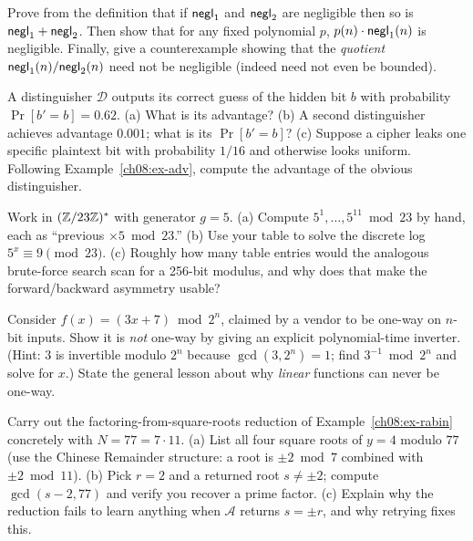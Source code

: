 \begin{exercise}
\label{ch08:ex-2}
Prove from the definition that if $\mathsf{negl}_1$ and $\mathsf{negl}_2$ are negligible then so is $\mathsf{negl}_1 + \mathsf{negl}_2$. Then show that for any fixed polynomial $p$, $p(n)\cdot\mathsf{negl}_1(n)$ is negligible. Finally, give a counterexample showing that the \emph{quotient} $\mathsf{negl}_1(n)/\mathsf{negl}_2(n)$ need not be negligible (indeed need not even be bounded).
\end{exercise}

\begin{exercise}
\label{ch08:ex-3}
A distinguisher $\mathcal D$ outputs its correct guess of the hidden bit $b$ with probability $\Pr[b'=b] = 0.62$. (a) What is its advantage? (b) A second distinguisher achieves advantage $0.001$; what is its $\Pr[b'=b]$? (c) Suppose a cipher leaks one specific plaintext bit with probability $1/16$ and otherwise looks uniform. Following Example~\ref{ch08:ex-adv}, compute the advantage of the obvious distinguisher.
\end{exercise}

\begin{exercise}
\label{ch08:ex-4}
Work in $(\mathbb{Z}/23\mathbb{Z})^{*}$ with generator $g=5$. (a) Compute $5^{1},\dots,5^{11} \bmod 23$ by hand, each as ``previous $\times 5 \bmod 23$.'' (b) Use your table to solve the discrete log $5^{x}\equiv 9 \pmod{23}$. (c) Roughly how many table entries would the analogous brute-force search scan for a 256-bit modulus, and why does that make the forward/backward asymmetry usable?
\end{exercise}

\begin{exercise}
\label{ch08:ex-5}
Consider $f(x) = (3x + 7) \bmod 2^{n}$, claimed by a vendor to be one-way on $n$-bit inputs. Show it is \emph{not} one-way by giving an explicit polynomial-time inverter. (Hint: $3$ is invertible modulo $2^{n}$ because $\gcd(3,2^{n})=1$; find $3^{-1} \bmod 2^{n}$ and solve for $x$.) State the general lesson about why \emph{linear} functions can never be one-way.
\end{exercise}

\begin{exercise}
\label{ch08:ex-6}
Carry out the factoring-from-square-roots reduction of Example~\ref{ch08:ex-rabin} concretely with $N = 77 = 7 \cdot 11$. (a) List all four square roots of $y = 4$ modulo $77$ (use the Chinese Remainder structure: a root is $\pm 2 \bmod 7$ combined with $\pm 2 \bmod 11$). (b) Pick $r = 2$ and a returned root $s \ne \pm 2$; compute $\gcd(s - 2, 77)$ and verify you recover a prime factor. (c) Explain why the reduction fails to learn anything when $\mathcal A$ returns $s = \pm r$, and why retrying fixes this.
\end{exercise}

